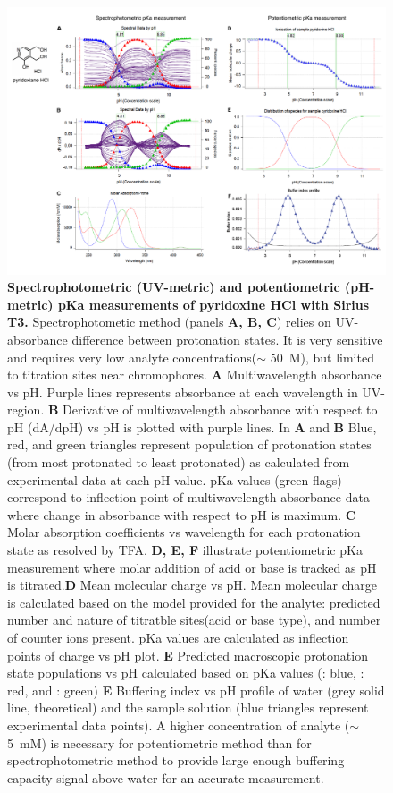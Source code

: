\documentclass[9pt,lineno]{elife}
\begin{document}
\begin{figure}
\includegraphics[width=0.95\linewidth]{figures/UVmetric_vs_pHmetric_pKa_figure}
\caption{{\bf Spectrophotometric (UV-metric) and potentiometric (pH-metric) pKa measurements of pyridoxine HCl with Sirius T3.} Spectrophotometic method (panels \textbf{A, B, C}) relies on UV-absorbance difference between protonation states.  It is very sensitive and requires very low analyte concentrations($\sim$ 50~\micro M), but limited to titration sites near chromophores. \textbf{A} Multiwavelength absorbance vs pH. Purple lines represents absorbance at each wavelength in UV-region.  \textbf{B} Derivative of multiwavelength absorbance with respect to pH (dA/dpH) vs pH is plotted with purple lines. In \textbf{A} and \textbf{B} Blue, red, and green triangles represent population of protonation states (from most protonated to least protonated) as calculated from experimental data at each pH value. pKa values (green flags) correspond to inflection point of multiwavelength absorbance data where change in absorbance with respect to pH is maximum. \textbf{C} Molar absorption coefficients vs wavelength for each protonation state as resolved by TFA. \textbf{D, E, F} illustrate potentiometric pKa measurement where molar addition of acid or base is tracked as pH is titrated.\textbf{D} Mean molecular charge vs pH. Mean molecular charge is calculated based on the model provided for the analyte: predicted number and nature of titratble sites(acid or base type), and number of counter ions present. pKa values are calculated as inflection points of charge vs pH plot. \textbf{E} Predicted macroscopic protonation state populations vs pH calculated based on pKa values (: blue, : red, and : green) \textbf{E} Buffering index vs pH profile of water (grey solid line, theoretical) and the sample solution (blue triangles represent experimental data points). A higher concentration of analyte ($\sim$ 5~mM) is necessary for potentiometric method than for spectrophotometric method to provide large enough buffering capacity signal above water for an accurate measurement. 
}
\label{fig:UVmetric_vs_pHmetric_pKa}
\end{figure}
\end{document}
